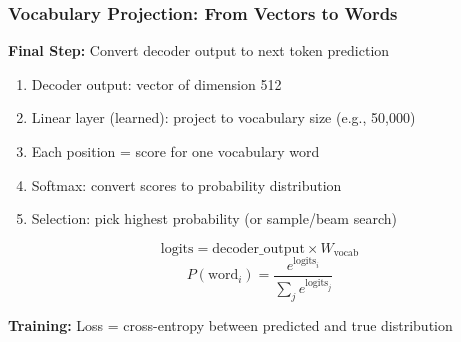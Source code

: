 \begin{frame}[fragile]\frametitle{Vocabulary Projection: From Vectors to Words}

\textbf{Final Step:} Convert decoder output to next token prediction

\begin{enumerate}
\item Decoder output: vector of dimension 512
\item Linear layer (learned): project to vocabulary size (e.g., 50,000)
\item Each position = score for one vocabulary word
\item Softmax: convert scores to probability distribution
\item Selection: pick highest probability (or sample/beam search)
\end{enumerate}

$$\text{logits} = \text{decoder\_output} \times W_{\text{vocab}}$$
$$P(\text{word}_i) = \frac{e^{\text{logits}_i}}{\sum_j e^{\text{logits}_j}}$$

\textbf{Training:} Loss = cross-entropy between predicted and true distribution
\end{frame}

